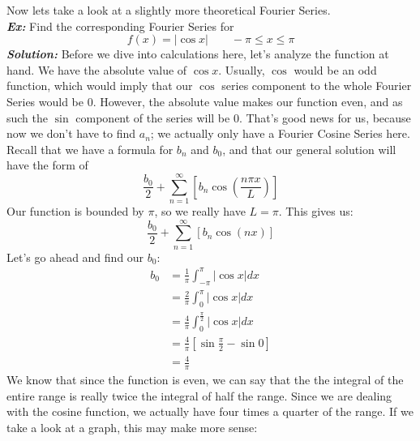 \documentclass{article}
\begin{document}
\newpage
\indent Now lets take a look at a slightly more theoretical Fourier Series.\\
\noindent\textbf{\textit{Ex:}} Find the corresponding Fourier Series for\\
\[f(x)=\left|\cos{x}\right|\qquad -\pi\leq x \leq \pi\]
\indent\textbf{\textit{Solution:}} Before we dive into calculations here, let's
analyze the function at hand. We have the absolute value of $\cos{x}$. Usually,
$\cos$ would be an odd function, which would imply that our $\cos$ series
component to the whole Fourier Series would be $0$. However, the absolute value
makes our function even, and as such the $\sin$ component of the series will be
$0$. That's good news for us, because now we don't have to find $a_{n}$; we
actually only have a Fourier Cosine Series here. Recall that we have a formula
for $b_{n}$ and $b_{0}$, and that our general solution will have the form of
\[\frac{b_{0}}{2} + \sum_{n=1}^{\infty}[b_{n}\cos{\left(\frac{n\pi x}{L}\right)}]\]
\noindent Our function is bounded by $\pi$, so we really have $L= \pi$. This gives us:
\[\frac{b_{0}}{2} + \sum_{n=1}^{\infty}[b_{n}\cos{\left(nx\right)}]\]
\noindent Let's go ahead and find our $b_{0}$:
\begin{align*}
b_{0} &= \frac{1}{\pi}\int_{-\pi}^{\pi}\left|\cos{x}\right|dx\\
&= \frac{2}{\pi}\int_{0}^{\pi}\left|\cos{x}\right|dx\\
&= \frac{4}{\pi}\int_{0}^{\frac{\pi}{2}}\left|\cos{x}\right|dx\\
&= \frac{4}{\pi}\left[\sin{\frac{\pi}{2}} - \sin{0}\right]\\
&= \frac{4}{\pi}
\end{align*}
\noindent We know that since the function is even, we can say that the the
integral of the entire range is really twice the integral of half the range.
Since we are dealing with the cosine function, we actually have four times a
quarter of the range. If we take a look at a graph, this may make more sense:\\
\end{document}
